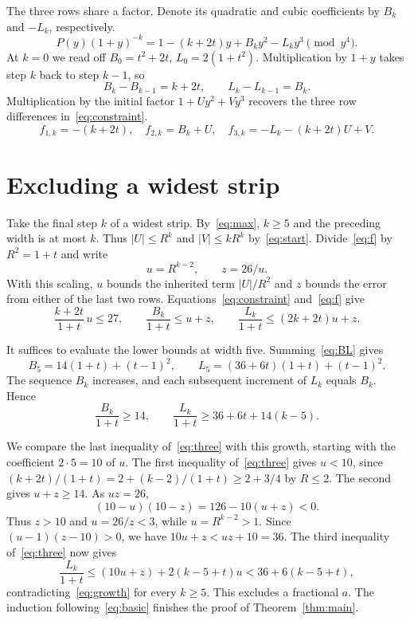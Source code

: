 \documentclass[11pt,reqno]{amsart}
\numberwithin{equation}{section}
\begin{document}
The three rows share a factor. Denote its quadratic and cubic coefficients by $B_k$ and $-L_k$, respectively.
\[
 P(y)(1+y)^{-k}=1-(k+2t)y+B_k y^2-L_k y^3\pmod{y^4}.
\]
At $k=0$ we read off $B_0=t^2+2t$, $L_0=2(1+t^2)$. Multiplication by $1+y$ takes step $k$ back to step $k-1$, so
\begin{equation}\label{eq:BL}
 B_k-B_{k-1}=k+2t,\qquad L_k-L_{k-1}=B_k .
\end{equation}
Multiplication by the initial factor $1+Uy^2+Vy^3$ recovers the three row differences in~\eqref{eq:constraint}.
\begin{equation}\label{eq:f}
 f_{1,k}=-(k+2t),\quad f_{2,k}=B_k+U,\quad
 f_{3,k}=-L_k-(k+2t)U+V .
\end{equation}

\section{Excluding a widest strip}\label{sec:short}
Take the final step $k$ of a widest strip. By~\eqref{eq:max}, $k\ge5$ and the preceding width is at most $k$. Thus $|U|\le R^k$ and $|V|\le kR^k$ by~\eqref{eq:start}. Divide~\eqref{eq:f} by $R^2=1+t$ and write
\[
 u=R^{k-2},\qquad z=26/u.
\]
With this scaling, $u$ bounds the inherited term $|U|/R^2$ and $z$ bounds the error from either of the last two rows. Equations~\eqref{eq:constraint} and~\eqref{eq:f} give
\begin{equation}\label{eq:three}
 \frac{k+2t}{1+t}\,u\le27,\qquad
 \frac{B_k}{1+t}\le u+z,\qquad
 \frac{L_k}{1+t}\le(2k+2t)u+z .
\end{equation}

It suffices to evaluate the lower bounds at width five. Summing~\eqref{eq:BL} gives
\[
 B_5=14(1+t)+(t-1)^2,\qquad
 L_5=(36+6t)(1+t)+(t-1)^2 .
\]
The sequence $B_k$ increases, and each subsequent increment of $L_k$ equals $B_k$. Hence
\begin{equation}\label{eq:growth}
 \frac{B_k}{1+t}\ge14,\qquad
 \frac{L_k}{1+t}\ge36+6t+14(k-5).
\end{equation}

We compare the last inequality of~\eqref{eq:three} with this growth, starting with the coefficient $2\cdot5=10$ of $u$. The first inequality of~\eqref{eq:three} gives $u<10$, since $(k+2t)/(1+t)=2+(k-2)/(1+t)\ge2+3/4$ by $R\le2$. The second gives $u+z\ge14$. As $uz=26$,
\[
 (10-u)(10-z)=126-10(u+z)<0 .
\]
Thus $z>10$ and $u=26/z<3$, while $u=R^{k-2}>1$. Since $(u-1)(z-10)>0$, we have $10u+z<uz+10=36$. The third inequality of~\eqref{eq:three} now gives
\[
 \frac{L_k}{1+t}\le (10u+z)+2(k-5+t)u
 <36+6(k-5+t),
\]
contradicting~\eqref{eq:growth} for every $k\ge5$. This excludes a fractional $a$. The induction following~\eqref{eq:basic} finishes the proof of Theorem~\ref{thm:main}.
\end{document}

